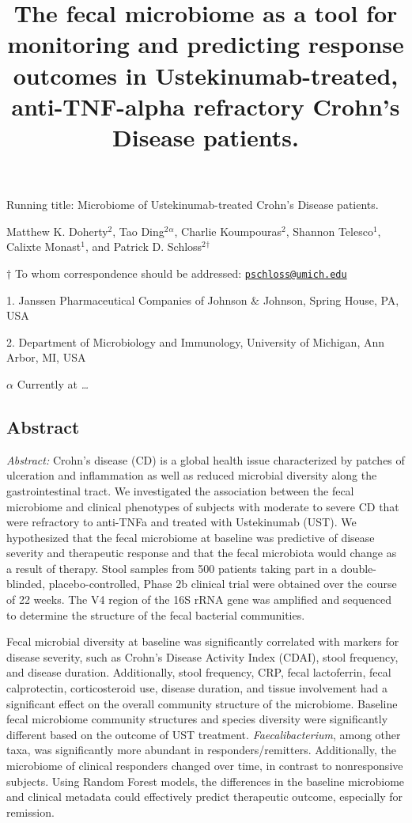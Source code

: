 \documentclass[11pt,]{article}
\title{The fecal microbiome as a tool for monitoring and predicting response
outcomes in Ustekinumab-treated, anti-TNF-alpha refractory Crohn's
Disease patients.}
\author{}
\date{}
\begin{document}
\maketitle

\vspace{35mm}

Running title: Microbiome of Ustekinumab-treated Crohn's Disease
patients.

\vspace{35mm} Matthew K. Doherty\({^2}\), Tao Ding\({^2}\)\({^\alpha}\),
Charlie Koumpouras\({^2}\), Shannon Telesco\({^1}\), Calixte
Monast\({^1}\), and Patrick D. Schloss\({^2}\)\({^\dagger}\)

\(\dagger\) To whom correspondence should be addressed:
\href{mailto:pschloss@umich.edu}{\nolinkurl{pschloss@umich.edu}}

1. Janssen Pharmaceutical Companies of Johnson \({\&}\) Johnson, Spring
House, PA, USA

2. Department of Microbiology and Immunology, University of Michigan,
Ann Arbor, MI, USA

\({\alpha}\) Currently at \emph{\ldots{}}

\newpage

\subsection{Abstract}\label{abstract}

\emph{Abstract:} Crohn's disease (CD) is a global health issue
characterized by patches of ulceration and inflammation as well as
reduced microbial diversity along the gastrointestinal tract. We
investigated the association between the fecal microbiome and clinical
phenotypes of subjects with moderate to severe CD that were refractory
to anti-TNFa and treated with Ustekinumab (UST). We hypothesized that
the fecal microbiome at baseline was predictive of disease severity and
therapeutic response and that the fecal microbiota would change as a
result of therapy. Stool samples from 500 patients taking part in a
double-blinded, placebo-controlled, Phase 2b clinical trial were
obtained over the course of 22 weeks. The V4 region of the 16S rRNA gene
was amplified and sequenced to determine the structure of the fecal
bacterial communities.

Fecal microbial diversity at baseline was significantly correlated with
markers for disease severity, such as Crohn's Disease Activity Index
(CDAI), stool frequency, and disease duration. Additionally, stool
frequency, CRP, fecal lactoferrin, fecal calprotectin, corticosteroid
use, disease duration, and tissue involvement had a significant effect
on the overall community structure of the microbiome. Baseline fecal
microbiome community structures and species diversity were significantly
different based on the outcome of UST treatment.
\emph{Faecalibacterium}, among other taxa, was significantly more
abundant in responders/remitters. Additionally, the microbiome of
clinical responders changed over time, in contrast to nonresponsive
subjects. Using Random Forest models, the differences in the baseline
microbiome and clinical metadata could effectively predict therapeutic
outcome, especially for remission.
\end{document}
